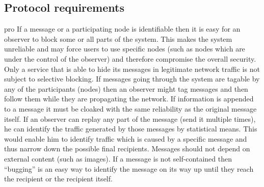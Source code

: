 \documentclass[12pt,journal,compsoc]{IEEEtran}
\begin{document}
\subsection{Protocol requirements}
\begin{entity}{pro}
		If a message or a participating node is identifiable then it is easy for an observer to block some or all parts of the system. This makes the system unreliable and may force users to use specific nodes (such as nodes which are under the control of the observer) and therefore compromise the overall security. Only a service that is able to hide its messages in legitimate network traffic is not subject to selective blocking.
		If messages going through the system are tagable by any of the participants (nodes) then an observer might tag messages and then follow them while they are propagating the network. If information is appended to a message it must be cloaked with the same reliability as the original message itself.
		If an observer can replay any part of the message (send it multiple times), he can identify the traffic generated by those messages by statistical means. This would enable him to identify traffic which is caused by a specific message and thus narrow down the possible final recipients.
		Messages should not depend on external content (such as images). If a message is not self-contained then ``bugging'' is an easy way to identify the message on its way up until they reach the recipient or the recipient itself.
\end{entity}
\end{document}
